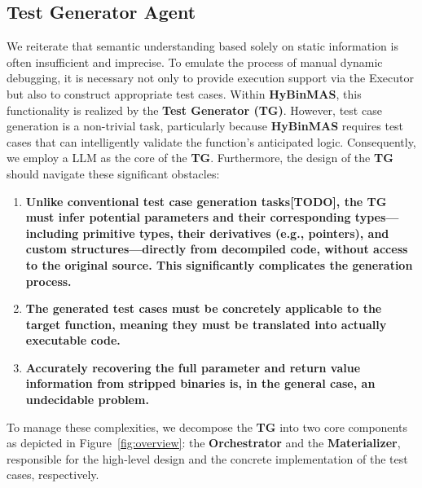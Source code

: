 \documentclass[acmsmall,screen,review,anonymous]{acmart} %
\begin{document}
\subsection{Test Generator Agent}
\label{sec:tg_design}

We reiterate that semantic understanding based solely on static information is often insufficient and imprecise. To emulate the process of manual dynamic debugging, it is necessary not only to provide execution support via the Executor but also to construct appropriate test cases. Within \textbf{HyBinMAS}, this functionality is realized by the \textbf{Test Generator (TG)}. However, test case generation is a non-trivial task, particularly because \textbf{HyBinMAS} requires test cases that can intelligently validate the function's anticipated logic. Consequently, we employ a LLM as the core of the \textbf{TG}. Furthermore, the design of the \textbf{TG} should navigate these significant obstacles:

\begin{enumerate}
    \item \textbf{Unlike conventional test case generation tasks\textbf{[TODO]}, the TG must infer potential parameters and their corresponding types---including primitive types, their derivatives (e.g., pointers), and custom structures---directly from decompiled code, without access to the original source. This significantly complicates the generation process.}
    \item \textbf{The generated test cases must be concretely applicable to the target function, meaning they must be translated into actually executable code.}
    \item \textbf{Accurately recovering the full parameter and return value information from stripped binaries is, in the general case, an undecidable problem.\cite{sig_meet_opt}}
\end{enumerate}

To manage these complexities, we decompose the \textbf{TG} into two core components as depicted in Figure~\ref{fig:overview}: the \textbf{Orchestrator} and the \textbf{Materializer}, responsible for the high-level design and the concrete implementation of the test cases, respectively.
\end{document}
